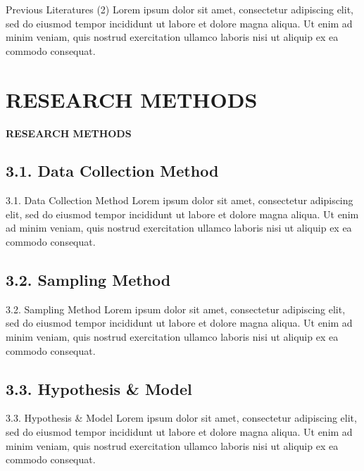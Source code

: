 \documentclass[11pt]{beamer}%
\begin{document}
\begin{frame}{Previous Literatures (2)}
	Lorem ipsum dolor sit amet, consectetur adipiscing elit, sed do eiusmod tempor incididunt ut labore et dolore magna aliqua. Ut enim ad minim veniam, quis nostrud exercitation ullamco laboris nisi ut aliquip ex ea commodo consequat.
\end{frame}

\section{RESEARCH METHODS}
\begin{frame}{}
	\begin{center} 
		\textbf{\huge RESEARCH METHODS}\vspace{-30pt} 
	\end{center}
\end{frame}

\subsection{3.1. Data Collection Method}
\begin{frame}{3.1. Data Collection Method}
	Lorem ipsum dolor sit amet, consectetur adipiscing elit, sed do eiusmod tempor incididunt ut labore et dolore magna aliqua. Ut enim ad minim veniam, quis nostrud exercitation ullamco laboris nisi ut aliquip ex ea commodo consequat.
\end{frame}

\subsection{3.2. Sampling Method}
\begin{frame}{3.2. Sampling Method}
	Lorem ipsum dolor sit amet, consectetur adipiscing elit, sed do eiusmod tempor incididunt ut labore et dolore magna aliqua. Ut enim ad minim veniam, quis nostrud exercitation ullamco laboris nisi ut aliquip ex ea commodo consequat.
\end{frame}

\subsection{3.3. Hypothesis \& Model}
\begin{frame}{3.3. Hypothesis \& Model}
	Lorem ipsum dolor sit amet, consectetur adipiscing elit, sed do eiusmod tempor incididunt ut labore et dolore magna aliqua. Ut enim ad minim veniam, quis nostrud exercitation ullamco laboris nisi ut aliquip ex ea commodo consequat.
	\end{frame}
\end{document}
